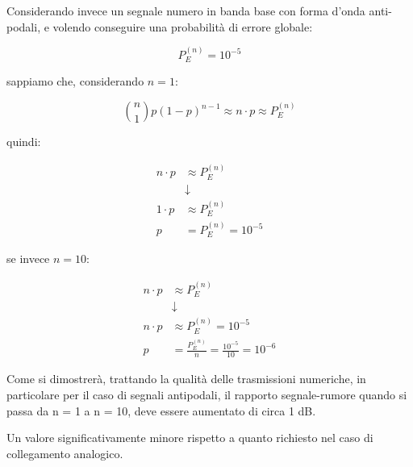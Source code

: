 Considerando invece un segnale numero in banda base con forma d'onda anti-podali, 
e volendo conseguire una probabilità di errore globale: 

{
    \Large 
    \begin{equation}
        P_{E}^{(n)} = 10^{-5}
    \end{equation}
}

sappiamo che, considerando $n = 1$: 

{
    \Large 
    \begin{equation}
        \binom{n}{1}p(1-p)^{n-1} 
        \approx 
        n \cdot p 
        \approx 
        P_{E}^{(n)}
    \end{equation}
}

quindi: 


{
    \Large 
    \begin{equation}
        \begin{split}
        n \cdot p 
        &\approx 
        P_{E}^{(n)} 
        \\
        &\downarrow
        \\
        1 \cdot p 
        &\approx 
        P_{E}^{(n)}
        \\
        p 
        &=
        P_{E}^{(n)}
        = 
        10^{-5} 
        \end{split} 
    \end{equation}
}

se invece $n = 10$: 

{
    \Large 
    \begin{equation}
        \begin{split}
        n \cdot p 
        &\approx 
        P_{E}^{(n)} 
        \\
        &\downarrow
        \\
        n \cdot p 
        &\approx 
        P_{E}^{(n)}
        =
        10^{-5}  
        \\
        p 
        &=
        \frac{P_{E}^{(n)}}{n}
        = 
        \frac{10^{-5}}{10}
        = 
        10^{-6}
        \end{split} 
    \end{equation}
}


Come si dimostrerà, trattando la qualità delle trasmissioni numeriche, 
in particolare per il caso di segnali antipodali, 
il rapporto segnale-rumore quando si passa da n = 1 a n = 10, 
deve essere aumentato di circa 1 dB. \newline 

Un valore significativamente minore rispetto a quanto richiesto nel caso di collegamento analogico. \newline 

\newpage 




